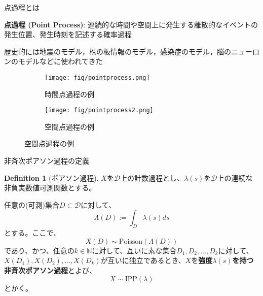 \documentclass[xelatex, 8pt]{beamer}
\theoremstyle{plain}
\theoremstyle{definition}
\newtheorem{dfn}{Definition}
\begin{document}
\begin{frame}{点過程とは}

\textbf{点過程 (Point Process)}: 連続的な時間や空間上に発生する離散的なイベントの発生位置、発生時刻を記述する確率過程

歴史的には地震のモデル，株の板情報のモデル，感染症のモデル，脳のニューロンのモデルなどに使われてきた

\begin{figure}
    \centering
    \begin{subfigure}{0.4\textwidth}
        \centering
        \texttt{[image: fig/pointprocess.png]}
        \caption{時間点過程の例}
        \label{fig:pointprocess1}
    \end{subfigure}
    \hfill
    \begin{subfigure}{0.4\textwidth}
        \centering
        \texttt{[image: fig/pointprocess2.png]}
        \caption{空間点過程の例}
        \label{fig:pointprocess2}
    \end{subfigure}
    \label{fig:both-predictions}
\end{figure}

\end{frame}

\begin{frame}{非斉次ポアソン過程の定義}
    \begin{dfn}[ポアソン過程]
        $X$を$\mathcal{D}$上の計数過程とし、$\lambda(s)$を$\mathcal{D}$上の連続な非負実数値可測関数とする。

        任意の(可測)集合$D \subset \mathcal{D}$に対して、
        $$
        \Lambda(D) := \int_D \lambda(s) ds
        $$
        とする。ここで、
        $$
        X(D) \sim \text{Poisson}(\Lambda(D))
        $$
        であり、かつ、任意の$k\in \mathbb{N}$に対して、互いに素な集合$D_1, D_2, \ldots , D_k$に対して、$X(D_1), X(D_2), \ldots , X(D_k)$が互いに独立であるとき、$X$を\textbf{強度$\lambda(s)$を持つ非斉次ポアソン過程}とよび、
        $$
        X \sim \text{IPP}(\lambda)
        $$
        とかく。
    \end{dfn}
\end{frame}
\end{document}
